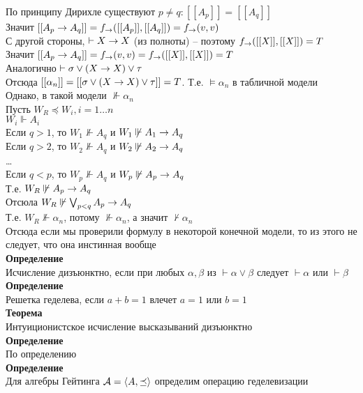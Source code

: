\documentclass[12pt]{article}
\begin{document}
По принципу Дирихле существуют $p\neq q: [[A_p]] = [[A_q]]$\\
Значит $[[A_p \rightarrow A_q]] = f_{\rightarrow}([[A_p]],[[A_q]]) = f_\rightarrow(v,v)$\\
С другой стороны, $\vdash X \rightarrow X$ (из полноты) -- поэтому $f_\rightarrow([[X]], [[X]]) = T$\\
Значит $[[A_p\rightarrow A_q]] = f_\rightarrow(v,v) = f_\rightarrow([[X]], [[X]]) = T$\\
Аналогично $\vdash \sigma\lor (X\rightarrow X) \lor \tau$\\
Отсюда $[[\alpha_n]] = [[\sigma\lor (X\rightarrow X)\lor \tau]] = T$. Т.е. $\models \alpha_n$ в табличной модели\\
Однако, в такой модели $\not \Vdash \alpha_n$\\
Пусть $W_R \preceq W_i, i = 1\ldots n$\\
$W_i \Vdash A_i$\\
Если $q > 1$, то $W_1 \not\Vdash A_q$ и $W_1 \not\Vdash A_1 \rightarrow A_q$\\
Если $q > 2$, то $W_2 \not\Vdash A_q$ и $W_2 \not\Vdash A_2 \rightarrow A_q$\\
\ldots\\
Если $q < p$, то $W_p \not\Vdash A_q$ и $W_p \not\Vdash A_p \rightarrow A_q$\\
Т.е. $W_R \not\Vdash A_p \rightarrow A_q$\\
Отсюла $W_R \not\Vdash \bigvee_{p<q} A_p \rightarrow A_q$\\
Т.е. $W_R \not\Vdash \alpha_n$, потому $\not\Vdash \alpha_n$, а значит $\not\vdash \alpha_n$\\
Отсюда если мы проверили формулу в некоторой конечной модели, то из этого не следует, что она инстинная вообще\\
\textbf{Определение}\\
Исчисление дизъюнктно, если при любых $\alpha,\beta$ из $\vdash \alpha\lor \beta$ следует $\vdash \alpha$ или $\vdash \beta$\\
\textbf{Определение}\\
Решетка геделева, если $a+b = 1$ влечет $a=1$ или $b=1$\\
\textbf{Теорема}\\
Интуиционистское исчисление высказываний дизъюнктно\\
\textbf{Определение}\\
По определению\\
\textbf{Определение}\\
Для алгебры Гейтинга $\mathcal{A} = \langle A, \preceq \rangle$ определим операцию геделевизации\\
\end{document}
